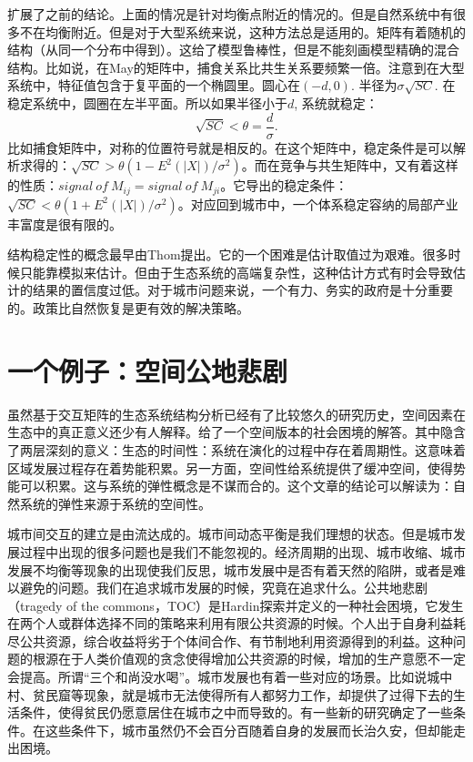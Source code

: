 \cite{Allesina2012}扩展了之前的结论。上面的情况是针对均衡点附近的情况的。但是自然系统中有很多不在均衡附近。但是对于大型系统来说，这种方法总是适用的。矩阵有着随机的结构（从同一个分布中得到）。这给了模型鲁棒性，但是不能刻画模型精确的混合结构。比如说，在May的矩阵中，捕食关系比共生关系要频繁一倍。注意到在大型系统中，特征值包含于复平面的一个椭圆里。圆心在$(-d,0).$ 半径为$\sigma\sqrt{SC}.$ 在稳定系统中，圆圈在左半平面。所以如果半径小于$d$, 系统就稳定：\[\sqrt{SC}<\theta =\frac{d}{\sigma}.\]比如捕食矩阵中，对称的位置符号就是相反的。在这个矩阵中，稳定条件是可以解析求得的：$\sqrt{SC}>\theta(1-E^2(|X|)/\sigma^2)$。而在竞争与共生矩阵中，又有着这样的性质：$signal\ of\ M_{ij}=signal\ of\ M_{ji}$。它导出的稳定条件：$\sqrt{SC}<\theta(1+E^2(|X|)/\sigma^2)$。对应回到城市中，一个体系稳定容纳的局部产业丰富度是很有限的。

结构稳定性的概念最早由Thom\cite{thom2018structural}提出。它的一个困难是估计取值过为艰难。很多时候只能靠模拟来估计。但由于生态系统的高端复杂性，这种估计方式有时会导致估计的结果的置信度过低。对于城市问题来说，一个有力、务实的政府是十分重要的。政策比自然恢复是更有效的解决策略。


\section{一个例子：空间公地悲剧}

虽然基于交互矩阵的生态系统结构分析已经有了比较悠久的研究历史，空间因素在生态中的真正意义还少有人解释。\cite{PhysRevLett.122.148102}给了一个空间版本的社会困境的解答。其中隐含了两层深刻的意义：生态的时间性：系统在演化的过程中存在着周期性。这意味着区域发展过程存在着势能积累。另一方面，空间性给系统提供了缓冲空间，使得势能可以积累。这与系统的弹性\cite{gao2016universal}概念是不谋而合的。这个文章的结论可以解读为：自然系统的弹性来源于系统的空间性。

城市间交互的建立是由流达成的。城市间动态平衡是我们理想的状态。但是城市发展过程中出现的很多问题也是我们不能忽视的。经济周期的出现、城市收缩、城市发展不均衡等现象的出现使我们反思，城市发展中是否有着天然的陷阱，或者是难以避免的问题。我们在追求城市发展的时候，究竟在追求什么。公共地悲剧（tragedy of the commons，TOC）是Hardin\cite{hardin1968tragedy}探索并定义的一种社会困境，它发生在两个人或群体选择不同的策略来利用有限公共资源的时候。个人出于自身利益耗尽公共资源，综合收益将劣于个体间合作、有节制地利用资源得到的利益。这种问题的根源在于人类价值观的贪念使得增加公共资源的时候，增加的生产意愿不一定会提高。所谓“三个和尚没水喝”。城市发展也有着一些对应的场景。比如说城中村、贫民窟等现象，就是城市无法使得所有人都努力工作，却提供了过得下去的生活条件，使得贫民仍愿意居住在城市之中而导致的。有一些新的研究确定了一些条件。在这些条件下，城市虽然仍不会百分百随着自身的发展而长治久安，但却能走出困境。

